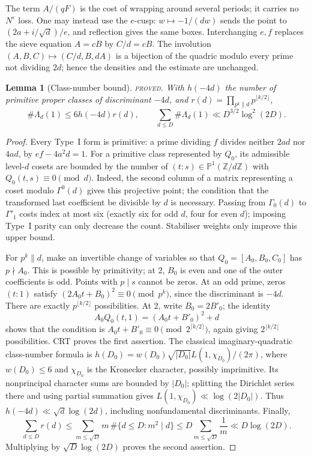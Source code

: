 \documentclass[10pt,reqno]{amsart}
\newtheorem{lemma}[theorem]{Lemma}
\theoremstyle{definition}
\numberwithin{equation}{section}
\newcommand{\Z}{\mathbb Z}
\newcommand{\status}[1]{\textup{\textsc{#1}}}
\begin{document}
The term \(A/(qF)\) is the cost of wrapping around several periods;
it carries no \(N^\varepsilon\) loss. One may instead use the \(e\)-cusp:
\(w\mapsto-1/(dw)\) sends the point to
\((2a+i/\sqrt d)/e\), and reflection gives the same boxes.
Interchanging \(e,f\) replaces the sieve equation \(A=cB\) by
\(C/d=cB\). The involution
\((A,B,C)\mapsto(C/d,B,dA)\) is a bijection of the quadric modulo every
prime not dividing \(2d\); hence the densities and the estimate are
unchanged.

\begin{lemma}[Class-number bound]\label{L:6.3}
\status{proved}. With \(h(-4d)\) the number of primitive proper classes
of discriminant \(-4d\), and
\(r(d)=\prod_{p^k\parallel d}p^{\lfloor k/2\rfloor}\),
\[
 \#\Lambda_d(1)\le6h(-4d)r(d),\qquad
 \sum_{d\le D}\#\Lambda_d(1)\ll D^{3/2}\log^2(2D).
\]
\end{lemma}
\begin{proof}
Every Type~I form is primitive: a prime dividing \(f\) divides neither
\(2ad\) nor \(4ad\), by \(ef-4a^2d=1\).
For a primitive class represented by \(Q_0\), its admissible level-\(d\)
cosets are bounded by the number of
\((t:s)\in\mathbb P^1(\Z/d\Z)\) with \(Q_0(t,s)\equiv0\pmod d\).
Indeed, the second column of a matrix representing a coset modulo
\(\Gamma^0(d)\) gives this projective point; the condition that the
transformed last coefficient be divisible by \(d\) is necessary.
Passing from \(\Gamma_0(d)\) to \(\Gamma'_1\) costs index at most six
(exactly six for odd \(d\), four for even \(d\)); imposing Type~I parity
can only decrease the count. Stabiliser weights only improve this upper bound.

For \(p^k\parallel d\), make an invertible change of variables so that
\(Q_0=[A_0,B_0,C_0]\) has \(p\nmid A_0\). This is possible by primitivity;
at 2, \(B_0\) is even and one of the outer coefficients is odd.
Points with \(p\mid s\) cannot be zeros. At an odd prime, zeros
\((t:1)\) satisfy
\((2A_0t+B_0)^2\equiv0\pmod{p^k}\), since the discriminant is \(-4d\).
There are exactly \(p^{\lfloor k/2\rfloor}\) possibilities.
At 2, write \(B_0=2B'_0\); the identity
\[
 A_0Q_0(t,1)=(A_0t+B'_0)^2+d
\]
shows that the condition is
\(A_0t+B'_0\equiv0\pmod{2^{\lceil k/2\rceil}}\), again giving
\(2^{\lfloor k/2\rfloor}\) possibilities. CRT proves the first assertion.
The classical imaginary-quadratic class-number formula
\cite{IK} is
\(h(D_0)=w(D_0)\sqrt{|D_0|}L(1,\chi_{D_0})/(2\pi)\),
where \(w(D_0)\le6\) and \(\chi_{D_0}\) is the Kronecker character,
possibly imprimitive. Its nonprincipal character sums are bounded by
\(|D_0|\); splitting the Dirichlet series there and using partial
summation gives \(L(1,\chi_{D_0})\ll\log(2|D_0|)\).
Thus \(h(-4d)\ll\sqrt d\log(2d)\), including nonfundamental discriminants.
Finally,
\[
 \sum_{d\le D}r(d)
 \le\sum_{m\le\sqrt D}m\,\#\{d\le D:m^2\mid d\}
 \le D\sum_{m\le\sqrt D}\frac1m\ll D\log(2D).
\]
Multiplying by \(\sqrt D\log(2D)\) proves the second assertion.
\end{proof}
\end{document}
